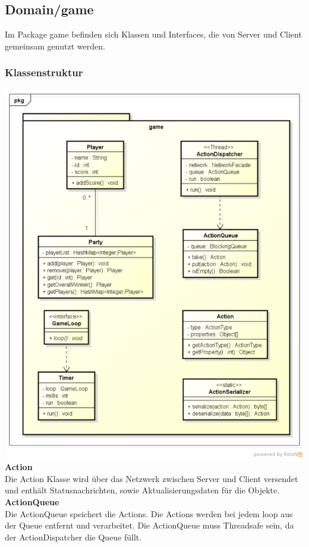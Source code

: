 \documentclass[11pt]{scrartcl}
\begin{document}
\newpage

\subsection{Domain/game}
Im Package game befinden sich Klassen und Interfaces, die von Server und Client gemeinsam genutzt werden.
\subsubsection{Klassenstruktur}
\includegraphics[scale=0.75]{ClassDiagramGame}
\newpage
\textbf{Action}\\
Die Action Klasse wird über das Netzwerk zwischen Server und Client versendet und enthält Statusnachrichten, sowie Aktualisierungsdaten für die Objekte.\\

\textbf{ActionQueue}\\
Die ActionQueue speichert die Actions. Die Actions werden bei jedem loop aus der Queue entfernt und verarbeitet. Die ActionQueue muss Threadsafe sein, da der ActionDispatcher die Queue füllt.\\
\end{document}
